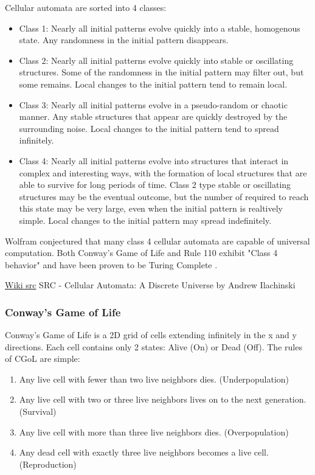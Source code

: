 Cellular automata are sorted into 4 classes:
\begin{itemize}
    \item Class 1: Nearly all initial patterns evolve quickly into a stable, homogenous state.
    Any randomness in the initial pattern disappears.
    \item Class 2: Nearly all initial patterns evolve quickly into stable or oscillating structures.
    Some of the randomness in the initial pattern may filter out, but some remains.
    Local changes to the initial pattern tend to remain local.
    \item Class 3: Nearly all initial patterns evolve in a pseudo-random or chaotic manner.
    Any stable structures that appear are quickly destroyed by the surrounding noise.
    Local changes to the initial pattern tend to spread infinitely.
    \item Class 4: Nearly all initial patterns evolve into structures that interact in complex and interesting ways, with the formation of local structures that are able to survive for long periods of time.
    Class 2 type stable or oscillating structures may be the eventual outcome, but the number of required to reach this state may be very large, even when the initial pattern is realtively simple.
    Local changes to the initial pattern may spread indefinitely.
\end{itemize}

Wolfram conjectured that many class 4 cellular automata are capable of universal computation.
Both Conway's Game of Life and Rule 110 exhibit "Class 4 behavior" and have been proven to be Turing Complete \cite{CGoLTM}.

\href{https://en.wikipedia.org/wiki/Cellular_automaton#Classification}{Wiki src}
SRC - Cellular Automata: A Discrete Universe by Andrew Ilachinski

\subsubsection{Conway's Game of Life}\label{subsubsec:CGoL}

Conway's Game of Life is a 2D grid of cells extending infinitely in the x and y directions.
Each cell contains only 2 states: Alive (On) or Dead (Off).
The rules of CGoL are simple:

\begin{enumerate}
    \item Any live cell with fewer than two live neighbors dies. (Underpopulation)
    \item Any live cell with two or three live neighbors lives on to the next generation. (Survival)
    \item Any live cell with more than three live neighbors dies. (Overpopulation)
    \item Any dead cell with exactly three live neighbors becomes a live cell. (Reproduction)
\end{enumerate}

